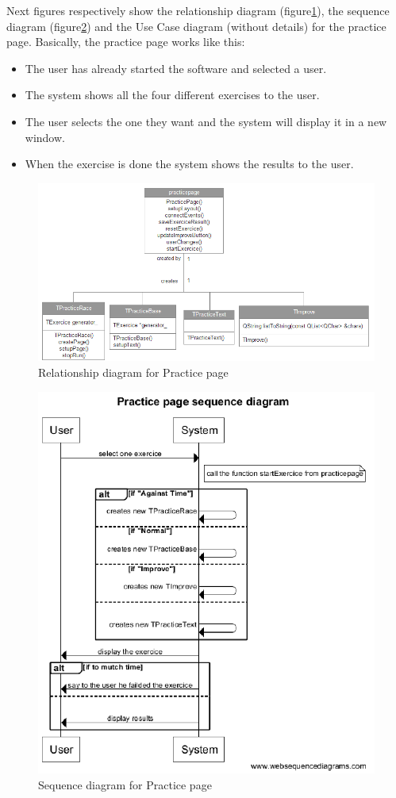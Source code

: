 Next figures respectively show the relationship diagram (figure\ref{Rpracticepage}), the sequence diagram (figure\ref{Spracticepage}) and the Use Case diagram (without details) for the practice page. Basically, the practice page works like this:
\begin{itemize}
\item The user has already started the software and selected a user.
\item The system shows all the four different exercises to the user.
\item The user selects the one they want and the system will display it in a new window.
\item When the exercise is done the system shows the results to the user.
\end{itemize}

\begin{figure}[H]
	\centering
    \includegraphics[width=12cm]{diagrams/Rpracticepage.png}
    \caption{Relationship diagram for Practice page}  
    \label{Rpracticepage} 
\end{figure}
\begin{figure}[H]
	\centering
    \includegraphics[width=12cm]{diagrams/Spracticepage.png}
    \caption{Sequence diagram for Practice page}
    \label{Spracticepage}
\end{figure}
